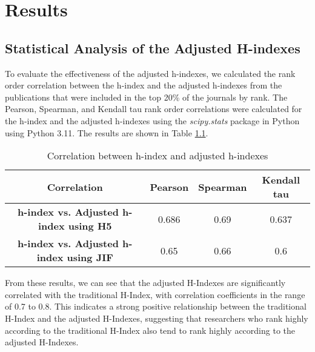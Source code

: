 \chapter{Results}
\label{ch:results}

\section{Statistical Analysis of the Adjusted H-indexes}

To evaluate the effectiveness of the adjusted h-indexes, we calculated the rank
order correlation between the h-index and the adjusted h-indexes from the
publications that were included in the top 20\% of the journals by rank. The
Pearson, Spearman, and Kendall tau rank order correlations were calculated for
the h-index and the adjusted h-indexes using the \emph{scipy.stats} package in
Python using Python 3.11. The results are shown in Table
\ref{tab:correlations}.

\begin{table}[H]
    \centering
    \begin{tabular}{|c|c|c|c|}
        \hline
        \textbf{Correlation}                            & \textbf{Pearson} & \textbf{Spearman} & \textbf{Kendall tau} \\ \hline
        \textbf{h-index vs. Adjusted h-index using H5}  & 0.686            & 0.69              & 0.637                \\ \hline
        \textbf{h-index vs. Adjusted h-index using JIF} & 0.65             & 0.66              & 0.6                  \\ \hline
    \end{tabular}
    \caption{Correlation between h-index and adjusted h-indexes}
    \label{tab:correlations}
\end{table}


From these results, we can see that the adjusted H-Indexes are significantly
correlated with the traditional H-Index, with correlation coefficients in the
range of 0.7 to 0.8. This indicates a strong positive relationship between the
traditional H-Index and the adjusted H-Indexes, suggesting that researchers who
rank highly according to the traditional H-Index also tend to rank highly
according to the adjusted H-Indexes.

